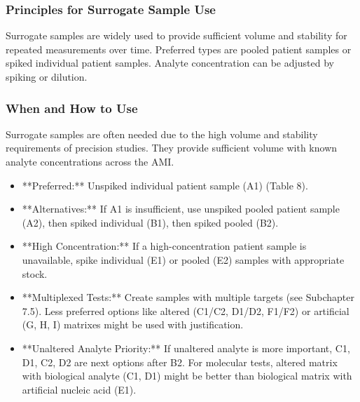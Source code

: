 \documentclass{article}
\begin{document}
\subsubsection{Principles for Surrogate Sample Use}
Surrogate samples are widely used to provide sufficient volume and stability for repeated measurements over time. Preferred types are pooled patient samples or spiked individual patient samples. Analyte concentration can be adjusted by spiking or dilution.

\subsubsection{When and How to Use}
Surrogate samples are often needed due to the high volume and stability requirements of precision studies. They provide sufficient volume with known analyte concentrations across the AMI.
\begin{itemize}
    \item **Preferred:** Unspiked individual patient sample (A1) (Table 8).
    \item **Alternatives:** If A1 is insufficient, use unspiked pooled patient sample (A2), then spiked individual (B1), then spiked pooled (B2).
    \item **High Concentration:** If a high-concentration patient sample is unavailable, spike individual (E1) or pooled (E2) samples with appropriate stock.
    \item **Multiplexed Tests:** Create samples with multiple targets (see Subchapter 7.5). Less preferred options like altered (C1/C2, D1/D2, F1/F2) or artificial (G, H, I) matrixes might be used with justification.
    \item **Unaltered Analyte Priority:** If unaltered analyte is more important, C1, D1, C2, D2 are next options after B2. For molecular tests, altered matrix with biological analyte (C1, D1) might be better than biological matrix with artificial nucleic acid (E1).
\end{itemize}
\end{document}
